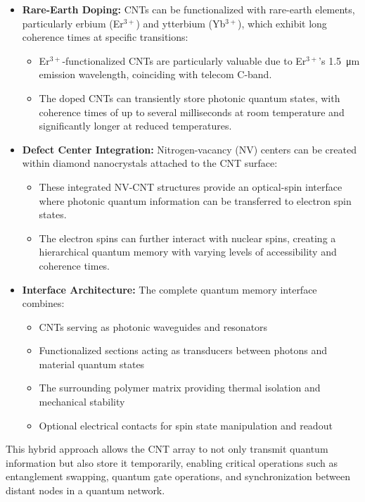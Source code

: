 \documentclass[11pt]{article}
\begin{document}
	\begin{itemize}
		\item \textbf{Rare-Earth Doping:} CNTs can be functionalized with rare-earth elements, particularly erbium (Er$^{3+}$) and ytterbium (Yb$^{3+}$), which exhibit long coherence times at specific transitions:
		\begin{itemize}
			\item Er$^{3+}$-functionalized CNTs are particularly valuable due to Er$^{3+}$'s \SI{1.5}{\micro\meter} emission wavelength, coinciding with telecom C-band.
			\item The doped CNTs can transiently store photonic quantum states, with coherence times of up to several milliseconds at room temperature and significantly longer at reduced temperatures.
		\end{itemize}
		
		\item \textbf{Defect Center Integration:} Nitrogen-vacancy (NV) centers can be created within diamond nanocrystals attached to the CNT surface:
		\begin{itemize}
			\item These integrated NV-CNT structures provide an optical-spin interface where photonic quantum information can be transferred to electron spin states.
			\item The electron spins can further interact with nuclear spins, creating a hierarchical quantum memory with varying levels of accessibility and coherence times.
		\end{itemize}
		
		\item \textbf{Interface Architecture:} The complete quantum memory interface combines:
		\begin{itemize}
			\item CNTs serving as photonic waveguides and resonators
			\item Functionalized sections acting as transducers between photons and material quantum states
			\item The surrounding polymer matrix providing thermal isolation and mechanical stability
			\item Optional electrical contacts for spin state manipulation and readout
		\end{itemize}
	\end{itemize}
	
	This hybrid approach allows the CNT array to not only transmit quantum information but also store it temporarily, enabling critical operations such as entanglement swapping, quantum gate operations, and synchronization between distant nodes in a quantum network.
	
\end{document}
